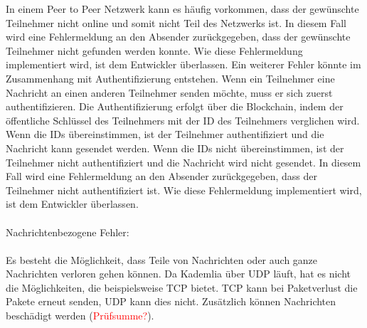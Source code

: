 In einem Peer to Peer Netzwerk kann es häufig vorkommen, dass der gewünschte Teilnehmer nicht online und somit nicht Teil des Netzwerks ist. In diesem Fall wird eine Fehlermeldung an den Absender zurückgegeben, dass der gewünschte Teilnehmer nicht gefunden werden konnte. Wie diese Fehlermeldung implementiert wird, ist dem Entwickler überlassen. Ein weiterer Fehler könnte im Zusammenhang mit Authentifizierung entstehen. Wenn ein Teilnehmer eine Nachricht an einen anderen Teilnehmer senden möchte, muss er sich zuerst authentifizieren. Die Authentifizierung erfolgt über die Blockchain, indem der öffentliche Schlüssel des Teilnehmers mit der ID des Teilnehmers verglichen wird. Wenn die IDs übereinstimmen, ist der Teilnehmer authentifiziert und die Nachricht kann gesendet werden. Wenn die IDs nicht übereinstimmen, ist der Teilnehmer nicht authentifiziert und die Nachricht wird nicht gesendet. In diesem Fall wird eine Fehlermeldung an den Absender zurückgegeben, dass der Teilnehmer nicht authentifiziert ist. Wie diese Fehlermeldung implementiert wird, ist dem Entwickler überlassen.
\\
\\
Nachrichtenbezogene Fehler:
\\
\\
Es besteht die Möglichkeit, dass Teile von Nachrichten oder auch ganze Nachrichten verloren gehen können. Da Kademlia über UDP läuft, hat es nicht die Möglichkeiten, die beispielsweise TCP bietet. TCP kann bei Paketverlust die Pakete erneut senden, UDP kann dies nicht. Zusätzlich können Nachrichten beschädigt werden (\textcolor{red}{Prüfsumme?}).
